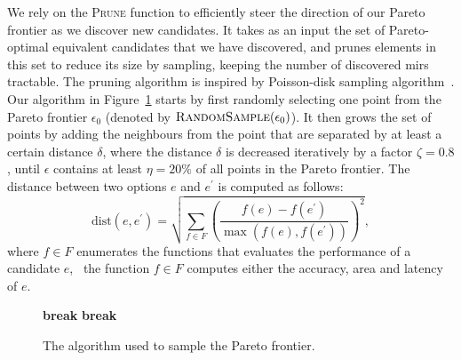 We rely on the \textsc{Prune} function to efficiently steer the direction
of our Pareto frontier as we discover new candidates.  It takes as an
input the set of Pareto-optimal equivalent candidates that we have
discovered, and prunes elements in this set to reduce its size by sampling,
keeping the number of discovered \glspl{mir} tractable.  The pruning
algorithm is inspired by Poisson-disk sampling algorithm~\cite{bridson07}.
Our algorithm in Figure~\ref{lo:alg:sample} starts by first randomly
selecting one point from the Pareto frontier $\epsilon_0$ (denoted by
$\textsc{RandomSample}(\epsilon_0)$).  It then grows the set of points by
adding the neighbours from the point that are separated by at least a certain
distance $\delta$, where the distance $\delta$ is decreased iteratively by
a factor $\zeta = 0.8$, until $\epsilon$ contains at least $\eta = 20\%$ of
all points in the Pareto frontier.  The distance between two options $e$ and
$e^\prime$ is computed as follows:
\begin{equation}
    \mathrm{dist} \left(e, e^\prime\right)
    = \sqrt{
        \sum_{f \in F} {\left(
            \frac{f(e) - f(e^\prime)}{\max(f(e), f(e^\prime))}
        \right)}^2
    },
\end{equation}
where $f \in F$ enumerates the functions that evaluates the performance of a
candidate $e$, \ie~the function $f \in F$ computes either the accuracy, area
and latency of $e$.

\begin{figure}[ht]
    \centering
    \begin{algorithmic}
        \singlespacing%
                            \State\textbf{break}
                        \EndIf%
                        \EndIf%
                    \EndFor%
                \EndFor%
                \If{$\left|\epsilon\right| \geq \eta \left|\epsilon_0\right|$}
                    \State\textbf{break}
                \EndIf%
                \State{$\delta = \zeta\delta$}
            \EndFor%
            \State{\Return{$\epsilon$}}
        \EndFunction%
    \end{algorithmic}
    \caption{%
        The algorithm used to sample the Pareto frontier.
    }\label{lo:alg:sample}
\end{figure}

